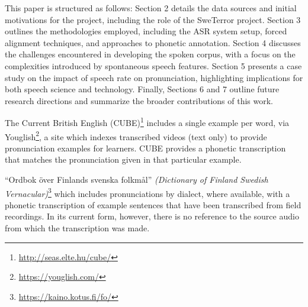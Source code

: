 \documentclass{Interspeech}
\begin{document}
This paper is structured as follows: Section 2 details the data sources and initial motivations for the project, including the role of the SweTerror project. Section 3 outlines the methodologies employed, including the ASR system setup, forced alignment techniques, and approaches to phonetic annotation. Section 4 discusses the challenges encountered in developing the spoken corpus, with a focus on the complexities introduced by spontaneous speech features. Section 5 presents a case study on the impact of speech rate on pronunciation, highlighting implications for both speech science and technology. Finally, Sections 6 and 7 outline future research directions and summarize the broader contributions of this work.


\cite{tannander2025braxen}

The Current British English (CUBE)\footnote{\href{http://seas.elte.hu/cube/}{http://seas.elte.hu/cube/}} includes a single example per word, via Youglish\footnote{\href{https://youglish.com/}{https://youglish.com/}}, a site which indexes transcribed videos (text only) to provide pronunciation examples for learners. CUBE provides a phonetic transcription that matches the pronunciation given in that particular example.

``Ordbok över Finlands svenska folkmål'' \textit{(Dictionary of Finland Swedish Vernacular)}\footnote{\href{https://kaino.kotus.fi/fo/}{https://kaino.kotus.fi/fo/}} which includes pronunciations by dialect, where available, with a phonetic transcription of example sentences that have been transcribed from field recordings. In its current form, however, there is no reference to the source audio from which the transcription was made.

\end{document}
